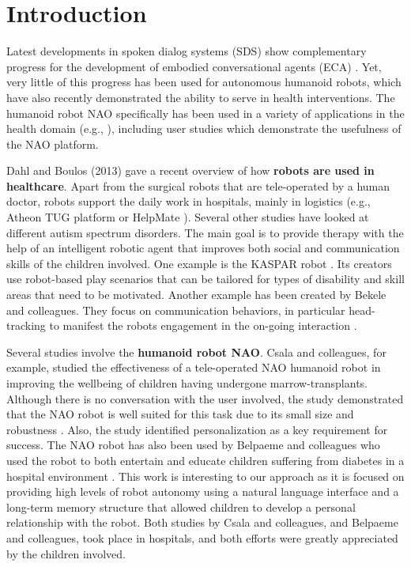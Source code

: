\documentclass[letterpaper]{article}
\begin{document}
\section{Introduction} \label{intro}

Latest developments in spoken dialog systems (SDS) show complementary progress for the development of  embodied conversational agents (ECA) \cite{YASCLL14}. Yet, very little of
this progress has been used for autonomous humanoid robots, which have also recently demonstrated the ability
to serve in health interventions. The
humanoid robot NAO specifically has been used in a variety of applications in the health domain (e.g.,
\cite{MAJA13}), including user studies which demonstrate the usefulness of the NAO platform.

Dahl and Boulos (2013) \nocite{robotics3010001} gave a recent overview of how {\bf robots are used in
healthcare}. Apart from the  surgical robots that are tele-operated by a human doctor, robots support
the daily work in hospitals, mainly in logistics (e.g., Atheon TUG platform \cite{bloss2011mobile}
or HelpMate \cite{evans1998helpmate}). Several other studies have looked at different autism
spectrum disorders. The main goal is to provide therapy with the help of an intelligent robotic
agent that improves both social and communication skills of the children involved. One example is
the KASPAR robot \cite{robins2012scenarios}. Its creators use robot-based play scenarios that can
be tailored for types of disability and skill areas that need to be motivated. Another example has
been created by Bekele and colleagues. They focus on communication behaviors, in particular
head-tracking to manifest the robots engagement in the on-going interaction \cite{bekele2013step}.  

Several studies involve the {\bf humanoid robot NAO}. Csala and colleagues, for example,
studied the effectiveness of a tele-operated NAO humanoid robot in improving the wellbeing of
children having undergone marrow-transplants. Although there is no conversation with the user
involved, the study demonstrated that the NAO robot is well suited for this task due to its small
size and robustness \cite{Csala2012}. Also, the study identified personalization as a key
requirement for success. The NAO robot has also been used by Belpaeme and colleagues who used the
robot to both entertain and educate children suffering from diabetes in a hospital environment
\cite{belpaeme2012multimodal}. This work is interesting to our approach as it is focused on
providing high levels of robot autonomy using a natural language interface and a long-term memory
structure that allowed children to develop a personal relationship with the robot. Both studies by
Csala and colleagues, and Belpaeme and colleagues, took place in hospitals, and both efforts were
greatly appreciated by the children involved.
\end{document}
